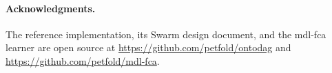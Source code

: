 \documentclass[10pt,twocolumn]{article}
\begin{document}
\paragraph{Acknowledgments.}
The reference implementation, its Swarm design document, and the mdl-fca
learner are open source at \url{https://github.com/petfold/ontodag} and
\url{https://github.com/petfold/mdl-fca}.

\begingroup
\small


\endgroup
\end{document}
